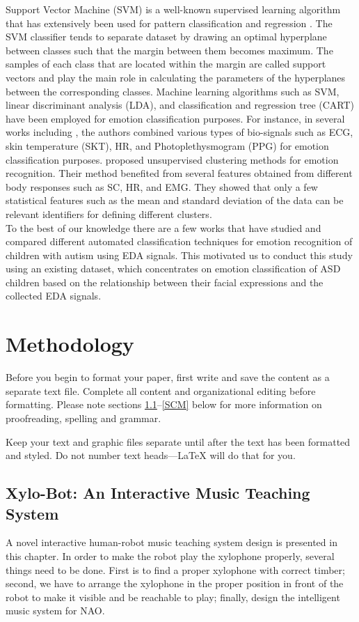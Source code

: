 \documentclass[conference]{IEEEtran}
\begin{document}
Support Vector Machine (SVM) is a well-known supervised learning algorithm that has 
extensively been used for pattern classification and regression \cite{SupportVector1995}. 
The SVM classifier tends to separate dataset by drawing an optimal hyperplane 
between classes such that the margin between them becomes maximum. The samples of 
each class that are located within the margin are called support vectors and play the 
main role in calculating the parameters of the hyperplanes between the corresponding 
classes. Machine learning algorithms such as SVM, linear discriminant analysis (LDA), 
and classification and regression tree (CART) have been employed for emotion 
classification purposes. For instance, in several works including \cite{Taxonomy2011, 
	EmotionClassifi2014}, the authors combined various types of bio-signals such as ECG, 
skin temperature (SKT), HR, and Photoplethysmogram (PPG) for  emotion classification 
purposes. \cite{FeatureSelection2006} proposed unsupervised clustering methods for emotion 
recognition. Their method benefited from several features obtained from different 
body responses such as SC, HR, and EMG. They showed that only a few statistical 
features such as the mean and standard deviation of the data can be relevant identifiers 
for defining different clusters. \\

To the best of our knowledge there are a few works \cite{EmotionResp2013, SlowEcho2009} 
that have studied and compared different automated 
classification techniques for emotion recognition of children with autism using EDA signals. 
This motivated us to conduct this study using an existing dataset, which concentrates 
on emotion classification of ASD children based on the relationship between their facial 
expressions and the collected EDA signals.

\section{Methodology}
Before you begin to format your paper, first write and save the content as a 
separate text file. Complete all content and organizational editing before 
formatting. Please note sections \ref{AA}--\ref{SCM} below for more information on 
proofreading, spelling and grammar.

Keep your text and graphic files separate until after the text has been 
formatted and styled. Do not number text heads---{\LaTeX} will do that 
for you.

\subsection{Xylo-Bot: An Interactive Music Teaching System}\label{AA}
A novel interactive human-robot music teaching system design is presented in 
this chapter. In order to make the robot play the xylophone properly, several things need 
to be done. First is to find a proper xylophone with correct timber; 
second, we have to arrange the xylophone in the proper position in front of the robot 
to make it visible and be reachable to play; finally, design the 
intelligent music system for NAO.\\
\end{document}
